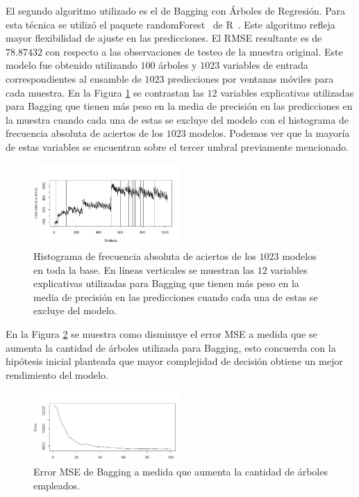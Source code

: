 \documentclass[a4paper,12pt,twocolumn]{article}
\begin{document}
El segundo algoritmo utilizado es el de Bagging con Árboles de Regresión. Para esta técnica se utilizó el paquete randomForest~\cite{randomForest} de R~\cite{r}. Este algoritmo refleja mayor flexibilidad de ajuste en las predicciones. El RMSE resultante es de $78.87432$ con respecto a las observaciones de testeo de la muestra original. Este modelo fue obtenido utilizando $100$ árboles y $1023$ variables de entrada correspondientes al ensamble de $1023$ predicciones por ventanas móviles para cada muestra. En la Figura \ref{aciertoBagging} se contrastan las $12$ variables explicativas utilizadas para Bagging que tienen más peso en la media de precisión en las predicciones en la muestra cuando cada una de estas se excluye del modelo con el histograma de frecuencia absoluta de aciertos de los $1023$ modelos. Podemos ver que la mayoría de estas variables se encuentran sobre el tercer umbral previamente mencionado.

\begin{figure}[!hbt]
\centering
\includegraphics[width=0.5\textwidth]{aciertoBagging}
\caption{Histograma de frecuencia absoluta de aciertos de los $1023$ modelos en toda la base. En líneas verticales se muestran las $12$ variables explicativas utilizadas para Bagging que tienen más peso en la media de precisión en las predicciones cuando cada una de estas se excluye del modelo.}
\label{aciertoBagging}
\end{figure}

En la Figura \ref{errorMSEBagging} se muestra como disminuye el error MSE a medida que se aumenta la cantidad de árboles utilizada para Bagging, esto concuerda con la hipótesis inicial planteada que mayor complejidad de decisión obtiene un mejor rendimiento del modelo.

\begin{figure}[!hbt]
\centering
\includegraphics[width=0.5\textwidth]{errorMSEBagging}
\caption{Error MSE de Bagging a medida que aumenta la cantidad de árboles empleados.}
\label{errorMSEBagging}
\end{figure}
\end{document}
